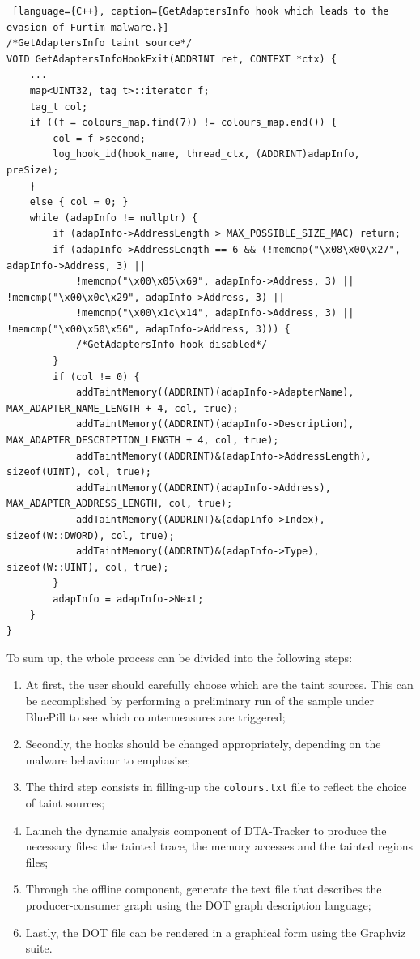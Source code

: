 \documentclass[LaM,binding=0.6cm]{sapthesis}
\begin{document}
\begin{lstlisting} [language={C++}, caption={GetAdaptersInfo hook which leads to the evasion of Furtim malware.}]
/*GetAdaptersInfo taint source*/
VOID GetAdaptersInfoHookExit(ADDRINT ret, CONTEXT *ctx) {
	...	
	map<UINT32, tag_t>::iterator f;
	tag_t col;
	if ((f = colours_map.find(7)) != colours_map.end()) {
		col = f->second;
		log_hook_id(hook_name, thread_ctx, (ADDRINT)adapInfo, preSize);
	}
	else { col = 0; }
	while (adapInfo != nullptr) {
		if (adapInfo->AddressLength > MAX_POSSIBLE_SIZE_MAC) return;
		if (adapInfo->AddressLength == 6 && (!memcmp("\x08\x00\x27", adapInfo->Address, 3) ||
			!memcmp("\x00\x05\x69", adapInfo->Address, 3) || !memcmp("\x00\x0c\x29", adapInfo->Address, 3) ||
			!memcmp("\x00\x1c\x14", adapInfo->Address, 3) || !memcmp("\x00\x50\x56", adapInfo->Address, 3))) {
			/*GetAdaptersInfo hook disabled*/
		}
		if (col != 0) {
			addTaintMemory((ADDRINT)(adapInfo->AdapterName), MAX_ADAPTER_NAME_LENGTH + 4, col, true);
			addTaintMemory((ADDRINT)(adapInfo->Description), MAX_ADAPTER_DESCRIPTION_LENGTH + 4, col, true);
			addTaintMemory((ADDRINT)&(adapInfo->AddressLength), sizeof(UINT), col, true);
			addTaintMemory((ADDRINT)(adapInfo->Address), MAX_ADAPTER_ADDRESS_LENGTH, col, true);
			addTaintMemory((ADDRINT)&(adapInfo->Index), sizeof(W::DWORD), col, true);
			addTaintMemory((ADDRINT)&(adapInfo->Type), sizeof(W::UINT), col, true);
		}
		adapInfo = adapInfo->Next;
	}
}
\end{lstlisting}
To sum up, the whole process can be divided into the following steps:
\begin{enumerate}
\item At first, the user should carefully choose which are the taint sources. This can be accomplished by performing a preliminary run of the sample under BluePill to see which countermeasures are triggered;
\item Secondly, the hooks should be changed appropriately, depending on the malware behaviour to emphasise;
\item The third step consists in filling-up the \texttt{colours.txt} file to reflect the choice of taint sources;
\item Launch the dynamic analysis component of {\sf DTA-Tracker} to produce the necessary files: the tainted trace, the memory accesses and the tainted regions files;
\item Through the offline component, generate the text file that describes the producer-consumer graph using the DOT graph description language;
\item Lastly, the DOT file can be rendered in a graphical form using the Graphviz suite.
\end{enumerate}

\backmatter
\cleardoublepage
{}
{}
\end{document}
